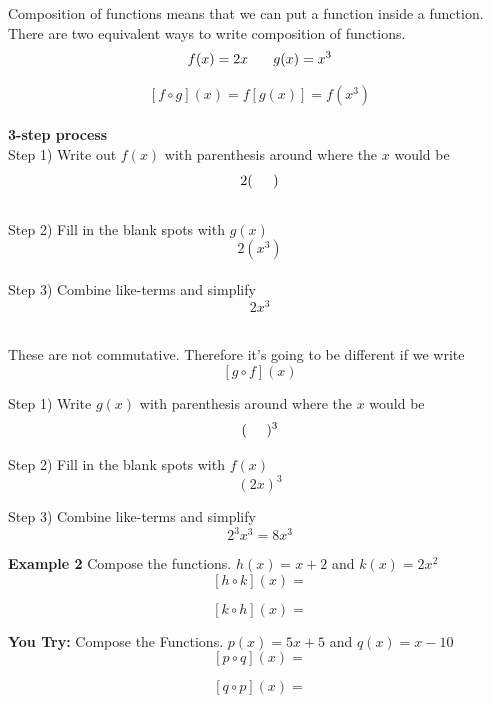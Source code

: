 \documentclass[12pt]{article}
\begin{document}
Composition of functions means that we can put a function inside a function. There are two equivalent ways to write composition of functions.\\

$$f(x)=2x \hspace{.25in} g(x)=x^3$$

$$[f \circ g](x)= f[g(x)]=f(x^3)$$\\



\textbf{3-step process}  \\

Step 1) Write out $f(x)$ with parenthesis around where the $x$ would be $$2(\hspace{.5cm})$$\\

Step 2) Fill in the blank spots with $g(x)$ $$2(x^3)$$\\

Step 3) Combine like-terms and simplify $$2x^3$$\\

\hrulefill

These are not commutative. Therefore it's going to be different if we write $$[g \circ f](x)$$

Step 1) Write $g(x)$ with parenthesis around where the $x$ would be $$(\hspace{.5cm})^3$$

Step 2) Fill in the blank spots with $f(x)$ $$(2x)^3$$

Step 3) Combine like-terms and simplify $$2^3x^3=8x^3$$



\textbf{Example 2} Compose the functions. $h(x)=x+2$ and $k(x)=2x^2$\\

$$[h \circ k](x)=$$

\vspace{1in}

$$[k \circ h](x)=$$

\vspace{1in}

\hrulefill

\textbf{You Try:} Compose the Functions. $p(x)=5x+5$ and $q(x)=x-10$\\

$$[p \circ q](x)=$$

\vspace{1in}

$$[q \circ p](x)=$$

\pagebreak
\end{document}
